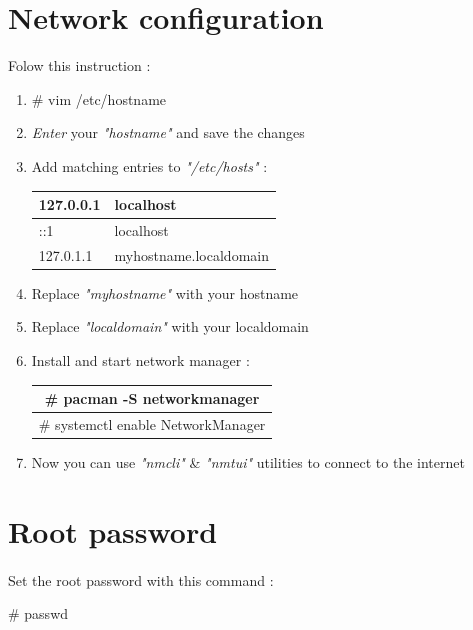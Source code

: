 \documentclass[12pt, a4paper]{article}
\begin{document}
\section{Network configuration}
Folow this instruction :

\begin{enumerate}
	\item \# vim /etc/hostname
	\item \textit{Enter} your \emph{"hostname"} and save the changes
	\item Add matching entries to \emph{"/etc/hosts"} :

\begin{center}
	\begin{tabular}{|ll|} \hline
		127.0.0.1 &  localhost\\ \hline
		::1				 &  localhost\\ \hline
		127.0.1.1 &  myhostname.localdomain	\space{myhostname}\\ \hline
	\end{tabular}
\end{center}

	\item Replace \emph{"myhostname"} with your hostname
	\item Replace \emph{"localdomain"} with your localdomain
	\item Install and start network manager :
	
	\begin{center}
		\begin{tabular}{|c|} \hline
			\# pacman -S networkmanager\\ \hline
			\# systemctl enable NetworkManager\\ \hline
		\end{tabular}
	\end{center}
	
	\item Now you can use \emph{"nmcli"} \& \emph{"nmtui"} utilities to connect to the internet
\end{enumerate}

\section{Root password}
\paragraph{}
Set the root password with this command :
\begin{flushleft}
	\# passwd
\end{flushleft}
\end{document}
